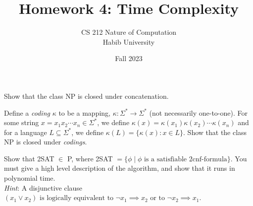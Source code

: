 \documentclass[addpoints,a4paper]{exam}
\title{Homework 4: Time Complexity}
\author{CS 212 Nature of Computation\\Habib University}
\date{Fall 2023}
\begin{document}
\maketitle

\begin{questions}
  

\question[25]


\question[20] Show that the class NP is closed under concatenation.

\question[25] Define a \textit{coding} $\kappa$ to be a mapping,  $\kappa:\Sigma^*\rightarrow \Sigma^*$ (not necessarily one-to-one). For some string $x = x_1x_2\cdots x_n\in\Sigma^*$, we define $\kappa(x) = \kappa(x_1)\kappa(x_2)\cdots\kappa(x_n)$ and for a language $L\subseteq \Sigma^*$, we define $\kappa(L) = \{\kappa(x): x\in L \}$. Show that the class NP is closed under \textit{codings}. 


\question[25] Show that 2SAT $\in$  P, where 2SAT $ = \{ \phi \mid \phi \text{ is a satisfiable 2cnf-formula}\}$. You must give a high level description of the algorithm, and show that it runs in polynomial time. \\ \textit{Hint}: A disjunctive clause $(x_1 \vee x_2) \text{ is logically equivalent to } \neg x_1 \implies x_2 \text{ or to } \neg x_2 \implies x_1$.

\end{questions}
\end{document}
